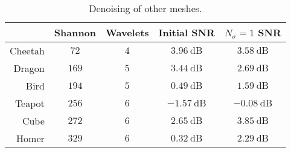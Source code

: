 \begin{table}
	\centering
	\caption{
		Denoising of other meshes.
	}\label{tab:chapter4_denoising}
	\begin{tabular}{@{}rcccc@{}}
		\toprule
		        & Shannon       & Wavelets    & Initial SNR         & \(N_{\sigma}=1\) SNR \\
		\midrule
		Cheetah & \(\num{72}\)  & \(\num{4}\) & \(\SI{3.96}{\dB}\)  & \(\SI{3.58}{\dB}\)   \\
		Dragon  & \(\num{169}\) & \(\num{5}\) & \(\SI{3.44}{\dB}\)  & \(\SI{2.69}{\dB}\)   \\
		Bird    & \(\num{194}\) & \(\num{5}\) & \(\SI{0.49}{\dB}\)  & \(\SI{1.59}{\dB}\)   \\
		Teapot  & \(\num{256}\) & \(\num{6}\) & \(\SI{-1.57}{\dB}\) & \(\SI{-0.08}{\dB}\)  \\
		Cube    & \(\num{272}\) & \(\num{6}\) & \(\SI{2.65}{\dB}\)  & \(\SI{3.85}{\dB}\)   \\
		Homer   & \(\num{329}\) & \(\num{6}\) & \(\SI{0.32}{\dB}\)  & \(\SI{2.29}{\dB}\)   \\
		\bottomrule
	\end{tabular}
\end{table}
